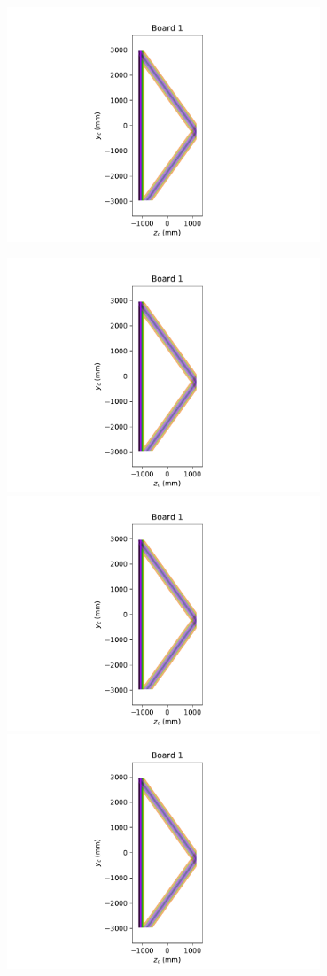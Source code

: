\documentclass[pdftex,12pt,letter]{article}
\begin{document}
\begin{figure}[h]
  \includegraphics[height=7cm,page=5,clip, trim=5cm 0 5cm 0]{test_plot_board.pdf}%

  \includegraphics[height=7cm,page=6,clip, trim=4cm 0 5cm 0]{test_plot_board.pdf}%
  \includegraphics[height=7cm,page=7,clip, trim=5cm 0 5cm 0]{test_plot_board.pdf}%
  \includegraphics[height=7cm,page=8,clip, trim=5cm 0 5cm 0]{test_plot_board.pdf}%

\end{figure}
\end{document}
